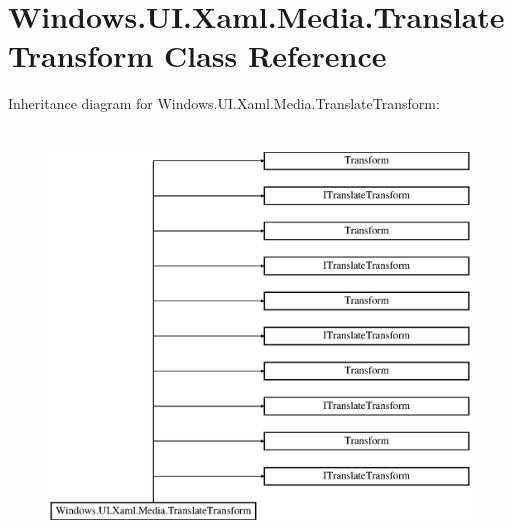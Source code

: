 \hypertarget{class_windows_1_1_u_i_1_1_xaml_1_1_media_1_1_translate_transform}{}\section{Windows.\+U\+I.\+Xaml.\+Media.\+Translate\+Transform Class Reference}
\label{class_windows_1_1_u_i_1_1_xaml_1_1_media_1_1_translate_transform}
Inheritance diagram for Windows.\+U\+I.\+Xaml.\+Media.\+Translate\+Transform\+:\begin{figure}[H]
\begin{center}
\leavevmode
\includegraphics[height=11.000000cm]{class_windows_1_1_u_i_1_1_xaml_1_1_media_1_1_translate_transform}
\end{center}
\end{figure}
